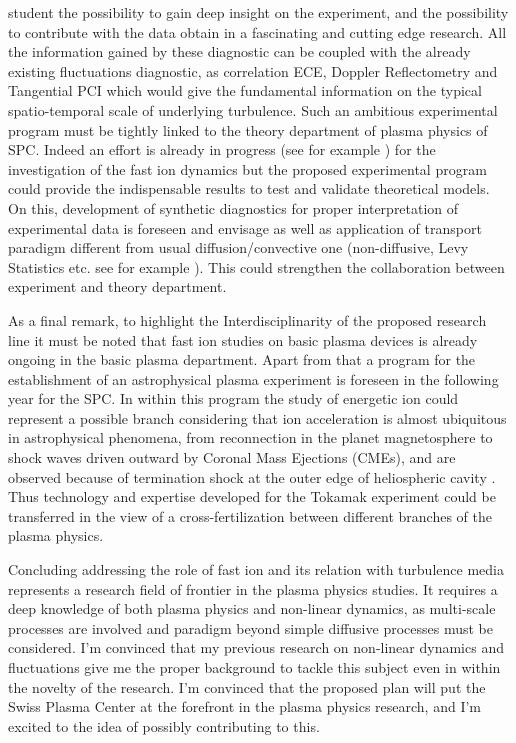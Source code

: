 \documentclass[12pt,a4paper]{article}
\begin{document}
student the possibility to gain deep insight on the experiment, and
the possibility to contribute with the data obtain in a fascinating
and cutting edge research. All the information gained by these
diagnostic can be coupled with the already existing fluctuations
diagnostic, as correlation ECE, Doppler Reflectometry and Tangential
PCI which would give the fundamental information on the typical
spatio-temporal scale of underlying turbulence. Such an ambitious
experimental program must be tightly linked to the theory department
of plasma physics of SPC. Indeed an effort is already in progress (see
for example \cite{Albergante:2011bj,Pfefferle:2014bk}) for
the investigation of the fast ion dynamics but the proposed
experimental program could provide the indispensable results to test
and validate theoretical models. On this,  development of synthetic
diagnostics for proper interpretation of experimental data is foreseen
and envisage as well as application of transport paradigm different
from usual diffusion/convective one (non-diffusive, Levy Statistics
etc. see for example \cite{Perrone:2013hp,Greco:2003fx}). This could strengthen the collaboration between
experiment and theory department. 

As a final remark, to highlight the Interdisciplinarity of the proposed
research line it must be noted that fast ion studies on basic
plasma devices is already ongoing in the basic plasma
department. Apart from that a program for the establishment of an
astrophysical plasma experiment is foreseen in the following year for
the SPC. In
within this program the study of energetic ion could represent a
possible branch considering that ion acceleration is almost ubiquitous in
astrophysical phenomena,  from reconnection in the planet
magnetosphere \cite{space-science-review} to shock waves driven
outward by Coronal Mass Ejections (CMEs), and are observed because of
termination shock at the outer edge of heliospheric cavity
\cite{Reames:1999bu}.
Thus
technology and expertise developed for the Tokamak experiment could be
transferred in the view of a cross-fertilization between different
branches of the plasma physics.

Concluding addressing the role of fast ion and its relation with
turbulence media represents a research field of frontier in the
plasma physics studies. It requires a deep knowledge of both plasma
physics and non-linear dynamics, as multi-scale processes are involved
and paradigm beyond simple diffusive processes must be considered. I'm
convinced that my previous research on non-linear dynamics and
fluctuations give me the proper background to tackle this
subject even in within the novelty of the research. I'm convinced that
the proposed plan will put the Swiss Plasma Center at the forefront in
the plasma physics research, and I'm excited to the idea of possibly
contributing to this.
\clearpage
\printbibliography[title=Personal publications cited,notkeyword=others, prefixnumbers={A}, resetnumbers=true]
\printbibliography[title=Other Sources, keyword=others, prefixnumbers={B}, resetnumbers=true]
\end{document}
